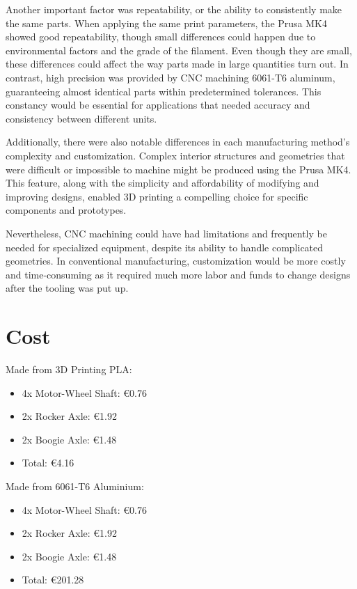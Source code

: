     Another important factor was repeatability, or the ability to consistently make the same parts. When
    applying the same print parameters, the Prusa MK4 showed good repeatability, though small differences
    could happen due to environmental factors and the grade of the filament. Even though they are small,
    these differences could affect the way parts made in large quantities turn out. In contrast, high precision
    was provided by CNC machining 6061-T6 aluminum, guaranteeing almost identical parts within
    predetermined tolerances. This constancy would be essential for applications that needed accuracy and
    consistency between different units.

    Additionally, there were also notable differences in each manufacturing method's complexity and
    customization. Complex interior structures and geometries that were difficult or impossible to machine
    might be produced using the Prusa MK4. This feature, along with the simplicity and affordability of modifying
    and improving designs, enabled 3D printing a compelling choice for specific components and prototypes.

    Nevertheless, CNC machining could have had limitations and frequently be needed for specialized
    equipment, despite its ability to handle complicated geometries. In conventional manufacturing,
    customization would be more costly and time-consuming as it required much more labor and funds to
    change designs after the tooling was put up.

\section{Cost}

    Made from 3D Printing PLA:
    \begin{itemize}
        \item 4x Motor-Wheel Shaft: €0.76
        \item 2x Rocker Axle: €1.92
        \item 2x Boogie Axle: €1.48
        \item Total: €4.16
    \end{itemize}

    Made from 6061-T6 Aluminium:

    \begin{itemize}
        \item 4x Motor-Wheel Shaft: €0.76
        \item 2x Rocker Axle: €1.92
        \item 2x Boogie Axle: €1.48
        \item Total: €201.28
    \end{itemize}

